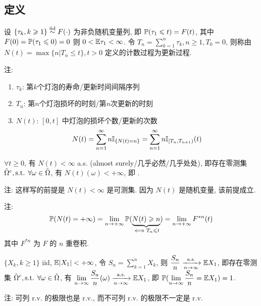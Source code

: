 \subsection{定义}

\begin{definition}
    设 $\{\tau_k,k\geqslant 1\}\overset{\text{iid}}{\sim} F(\cdot)$ 为非负随机变量列, 即 $\mathbb{P}(\tau_1\leqslant t)=F(t)$, 其中 $F(0)=\mathbb{P}(\tau_1\leqslant 0)=0$ 则 $0<\mathbb E \tau_1<\infty$. 令 $T_n=\sum_{k=1}^n\tau_k,n\geq 1,T_0=0$, 则称由 $N(t)=\max\{n|T_n\leq t\}, t>0$ 定义的计数过程为更新过程.  
\end{definition}
注:
\begin{enumerate}
    \item $\tau_k$: 第$k$个灯泡的寿命/更新时间间隔序列
    \item $T_n$: 第$n$个灯泡损坏的时刻/第$n$次更新的时刻
    \item $N(t)$: $[0,t]$ 中灯泡的损坏个数/更新的次数
    \[
    N(t)=\sum_{n=1}^{\infty}n\mathbb I_{\{N(t)=n\}}=\sum_{n=1}^{\infty}n\mathbb I_{[T_n,T_{n+1})}(t)
    \]
\end{enumerate}

\begin{lemma}\label{lem:p113-lem1}
    $\forall t\geq 0$, 有 $N(t)<\infty$ a.s. (almost surely/几乎必然/几乎处处), 即存在零测集 $\tilde{\Omega}^c,\text{s.t. } \forall \omega \in \tilde{\Omega}$, 有 $N(t)(\omega)<+\infty$, 即 .

    注: 这样写的前提是 $N(t)<\infty$ 是可测集. 因为 $N(t)$ 是随机变量, 该前提成立.
\end{lemma}

注:
\[
    \mathbb{P}(N(t)=+\infty)=\lim_{n\to +\infty}\mathbb{P}(\underbrace{N(t)\geqslant n}_{\iff T_n\leqslant t})=\lim_{n\to +\infty}F^{*n}(t)
\]
其中 $F^{*n}$ 为 $F$ 的 $n$ 重卷积.

\begin{theorem}[强大数定律]
    $\{X_k,k\geq 1\}$ iid, $\mathbb E |X_1|<+\infty$, 令 $S_n=\sum_{k=1}^nX_k$, 则 $\displaystyle \frac{S_n}{n}\xrightarrow[n\to\infty]{\text{a.s.}} \mathbb E X_1$, 即存在零测集 $\displaystyle \tilde{\Omega}^c,\text{s.t. } \forall \omega \in \tilde{\Omega}$, 有 $\displaystyle \lim_{n\to\infty}\frac{S_n}{n}(\omega)\xrightarrow[n\to\infty]{\text{a.s.}} \mathbb E X_1$, 即 $\displaystyle \mathbb{P}(\lim_{n\to\infty}\frac{S_n}{n}=\mathbb E X_1)=1$.
\end{theorem}
注: 可列 r.v. 的极限也是 r.v., 而不可列 r.v. 的极限不一定是 r.v.

